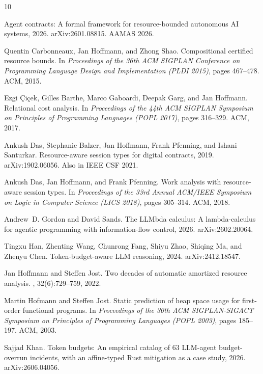 \documentclass[11pt]{article}
\theoremstyle{plain}
\begin{document}
\begin{thebibliography}{10}

Agent contracts: A formal framework for resource-bounded autonomous {AI}
  systems, 2026.
\newblock arXiv:2601.08815. AAMAS 2026.

Quentin Carbonneaux, Jan Hoffmann, and Zhong Shao.
\newblock Compositional certified resource bounds.
\newblock In {\em Proceedings of the 36th ACM SIGPLAN Conference on Programming
  Language Design and Implementation (PLDI 2015)}, pages 467--478. ACM, 2015.

Ezgi {\c{C}}i{\c{c}}ek, Gilles Barthe, Marco Gaboardi, Deepak Garg, and Jan
  Hoffmann.
\newblock Relational cost analysis.
\newblock In {\em Proceedings of the 44th ACM SIGPLAN Symposium on Principles
  of Programming Languages (POPL 2017)}, pages 316--329. ACM, 2017.

Ankush Das, Stephanie Balzer, Jan Hoffmann, Frank Pfenning, and Ishani
  Santurkar.
\newblock Resource-aware session types for digital contracts, 2019.
\newblock arXiv:1902.06056. Also in IEEE CSF 2021.

Ankush Das, Jan Hoffmann, and Frank Pfenning.
\newblock Work analysis with resource-aware session types.
\newblock In {\em Proceedings of the 33rd Annual ACM/IEEE Symposium on Logic in
  Computer Science (LICS 2018)}, pages 305--314. ACM, 2018.

Andrew~D. Gordon and David Sands.
\newblock The {LLMbda} calculus: A lambda-calculus for agentic programming with
  information-flow control, 2026.
\newblock arXiv:2602.20064.

Tingxu Han, Zhenting Wang, Chunrong Fang, Shiyu Zhao, Shiqing Ma, and Zhenyu
  Chen.
\newblock Token-budget-aware {LLM} reasoning, 2024.
\newblock arXiv:2412.18547.

Jan Hoffmann and Steffen Jost.
\newblock Two decades of automatic amortized resource analysis.
, 32(6):729--759,
  2022.

Martin Hofmann and Steffen Jost.
\newblock Static prediction of heap space usage for first-order functional
  programs.
\newblock In {\em Proceedings of the 30th ACM SIGPLAN-SIGACT Symposium on
  Principles of Programming Languages (POPL 2003)}, pages 185--197. ACM, 2003.

Sajjad Khan.
\newblock Token budgets: An empirical catalog of 63 {LLM}-agent budget-overrun
  incidents, with an affine-typed {R}ust mitigation as a case study, 2026.
\newblock arXiv:2606.04056.


\end{thebibliography}
\end{document}
